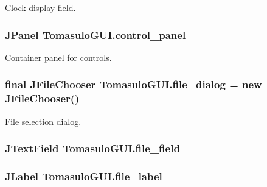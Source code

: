 \hyperlink{classClock}{\-Clock} display field. 

\hypertarget{classTomasuloGUI_a04c211874e22ab75cd47d35dca120c9d}{
\subsubsection[{control\-\_\-panel}]{\setlength{\rightskip}{0pt plus 5cm}\-J\-Panel {\bf \-Tomasulo\-G\-U\-I.\-control\-\_\-panel}}}\label{classTomasuloGUI_a04c211874e22ab75cd47d35dca120c9d}


\-Container panel for controls. 

\hypertarget{classTomasuloGUI_af5a309a292415fb6deb61903765d8679}{
\subsubsection[{file\-\_\-dialog}]{\setlength{\rightskip}{0pt plus 5cm}final \-J\-File\-Chooser {\bf \-Tomasulo\-G\-U\-I.\-file\-\_\-dialog} = new \-J\-File\-Chooser()}}\label{classTomasuloGUI_af5a309a292415fb6deb61903765d8679}


\-File selection dialog. 

\hypertarget{classTomasuloGUI_a4e028c3179fd14d926d7a1896f844a20}{
\subsubsection[{file\-\_\-field}]{\setlength{\rightskip}{0pt plus 5cm}\-J\-Text\-Field {\bf \-Tomasulo\-G\-U\-I.\-file\-\_\-field}}}\label{classTomasuloGUI_a4e028c3179fd14d926d7a1896f844a20}
\hypertarget{classTomasuloGUI_aac9070de64d1efb4a849cb0eb20015c4}{
\subsubsection[{file\-\_\-label}]{\setlength{\rightskip}{0pt plus 5cm}\-J\-Label {\bf \-Tomasulo\-G\-U\-I.\-file\-\_\-label}}}\label{classTomasuloGUI_aac9070de64d1efb4a849cb0eb20015c4}



